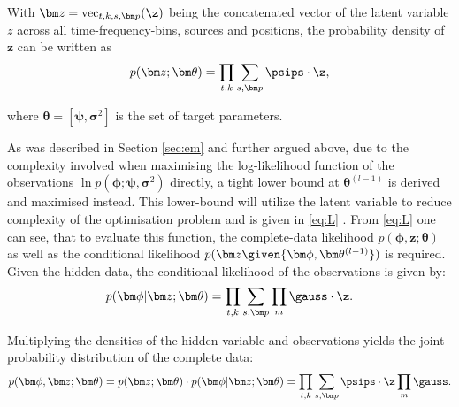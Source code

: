 With $\bm z=\text{vec}_{t,k,s,\bm p}(\z)$ being the concatenated vector of the latent variable $z$ across all time-frequency-bins, sources and positions, the probability density of $\bm z$ can be written as \begin{equation}
    p(\bm z;\bm\theta)=\prod_{t,k}\sum_{s,\bm p}\psips\cdot\z,
\end{equation}

where $\bm\theta=[\bm\psi,\bm\sigma^2]$ is the set of target parameters.


As was described in Section \ref{sec:em} and further argued above, due to the complexity involved when maximising the log-likelihood function of the observations $\ln p(\bm\phi;\bm\psi, \bm\sigma^2)$ directly, a tight lower bound at $\bm\theta^{(l-1)}$ is derived and maximised instead. This lower-bound will utilize the latent variable to reduce complexity of the optimisation problem and is given in \eqref{eq:L} . From \eqref{eq:L} one can see, that to evaluate this function, the complete-data likelihood $p(\bm\phi,\bm z; \bm\theta)$ as well as the conditional likelihood $p(\bm z\given{\bm\phi, \bm\theta^{(l-1)}})$ is required. Given the hidden data, the conditional likelihood of the observations is given by:
\begin{equation}
    p(\bm\phi |\bm z;\bm\theta)=\prod_{t,k}\sum_{s,\bm p}\prod_{m}\gauss\cdot\z.
\end{equation}

Multiplying the densities of the hidden variable and observations yields the joint probability distribution of the complete data:
\begin{equation}
    p(\bm\phi,\bm z;\bm\theta)=p(\bm z;\bm\theta)\cdot p(\bm\phi |\bm z;\bm\theta)=\prod_{t,k}\sum_{s,\bm p}\psips\cdot\z\prod_{m}\gauss .
\end{equation}

